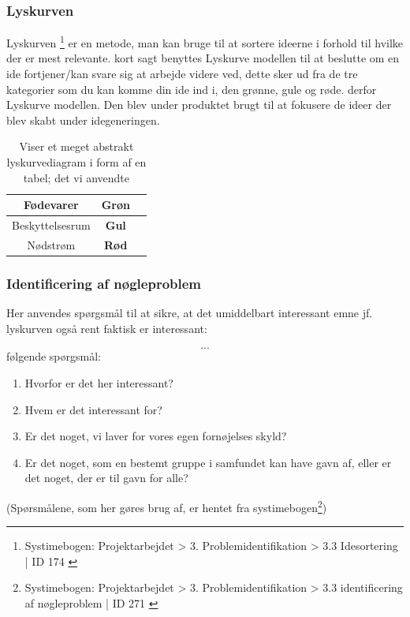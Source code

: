 \subsubsection{Lyskurven}
Lyskurven \footnote{Systimebogen: Projektarbejdet > 3. Problemidentifikation > 3.3 Idesortering | ID 174 \cite{projektarbejdet}} er en metode, man kan bruge til at sortere ideerne i forhold til hvilke der er mest relevante. kort sagt benyttes Lyskurve modellen til at beslutte om en ide fortjener/kan svare sig at arbejde videre ved, dette sker ud fra de tre kategorier som du kan komme din ide ind i, den grønne, gule og røde. derfor Lyskurve modellen. Den blev under produktet brugt til at fokusere de ideer der blev skabt under idegeneringen.

\begin{table}[H]
    \centering
    \begin{tabular}{|c|c|c|}
        \hline
        Fødevarer & \textbf{Grøn} \\
        \hline
        Beskyttelsesrum & \textbf{Gul} \\
        \hline
        Nødstrøm & \textbf{Rød} \\
        \hline
    \end{tabular}
    \caption{Viser et meget abstrakt lyskurvediagram i form af en tabel; det vi anvendte}
\end{table}

\newpage

\subsubsection{Identificering af nøgleproblem}
Her anvendes spørgsmål til at sikre, at det umiddelbart interessant emne jf. lyskurven også rent faktisk er interessant:
\begin{displayquote}
\[...\] følgende spørgsmål:
\begin{enumerate}
    \item Hvorfor er det her interessant?
    \item Hvem er det interessant for?
    \item Er det noget, vi laver for vores egen fornøjelses skyld?
    \item Er det noget, som en bestemt gruppe i samfundet kan have gavn af, eller er det noget, der er til gavn for alle?
\end{enumerate}
\end{displayquote}
(Spørsmålene, som her gøres brug af, er hentet fra systimebogen\footnote{Systimebogen: Projektarbejdet >
3. Problemidentifikation > 3.3 identificering af nøgleproblem | ID 271 \cite{projektarbejdet}})

